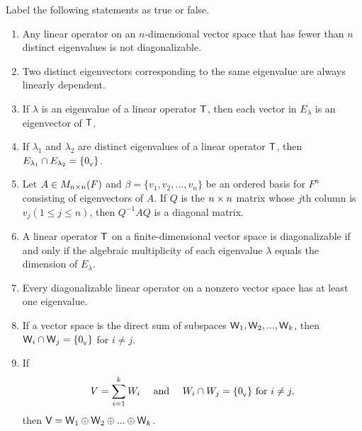 \exercisesection

\begin{exercise} \label{exercise 5.2.1}
Label the following statements as true or false.
\begin{enumerate}
\item Any linear operator on an \(n\)-dimensional vector space that has fewer than \(n\) distinct eigenvalues is not diagonalizable.
\item Two distinct eigenvectors corresponding to the same eigenvalue are always linearly dependent.
\item If \(\lambda\) is an eigenvalue of a linear operator \(\textsf{T}\), then each vector in \(E_{\lambda}\) is an eigenvector of \(\textsf{T}\).
\item If \(\lambda_1\) and \(\lambda_2\) are distinct eigenvalues of a linear operator \(\textsf{T}\), then \(E_{\lambda_1} \cap E_{\lambda_2} = \{ 0_{_{\textsf{V}}} \}\).
\item Let \(A \in M_{n \times n}(F)\) and \(\beta = \{ v_1, v_2, ..., v_n \}\) be an ordered basis for \(F^n\) consisting of eigenvectors of \(A\).
If \(Q\) is the \(n \times n\) matrix whose \(j\)th column is \(v_j (1 \le j \le n)\), then \(Q^{-1} A Q\) is a diagonal matrix.
\item A linear operator \(\textsf{T}\) on a finite-dimensional vector space is diagonalizable if and only if the algebraic multiplicity of each eigenvalue \(\lambda\) equals the dimension of \(E_{\lambda}\).
\item Every diagonalizable linear operator on a nonzero vector space has at least one eigenvalue.
\item If a vector space is the direct sum of subspaces \(\textsf{W}_1, \textsf{W}_2, ..., \textsf{W}_k\), then \(\textsf{W}_i \cap \textsf{W}_j = \{ 0_{_{\textsf{V}}} \}\) for \(i \ne j\).

\item If
\[
    V = \sum_{i = 1}^k W_i \quad \text{ and } \quad W_i \cap W_j = \{ 0_{_{\textsf{V}}} \} \text{ for } i \ne j,
\]
then \(\textsf{V} = \textsf{W}_1 \oplus \textsf{W}_2 \oplus ... \oplus \textsf{W}_k\).
\end{enumerate}
\end{exercise}

